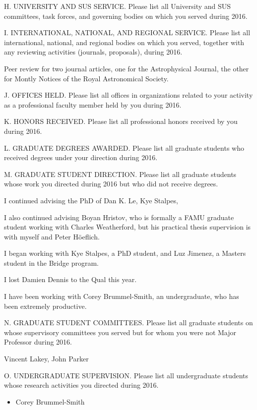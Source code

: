 \noindent H. UNIVERSITY AND SUS SERVICE. Please list all University
and SUS committees, task forces, and governing bodies on which you
served during 2016.
\bigskip
%

\noindent I. INTERNATIONAL, NATIONAL, AND REGIONAL  SERVICE. Please
list all international, national, and regional bodies on which you
served, together with any reviewing activities (journals,
proposals), during 2016.
\bigskip

Peer review for two journal articles, one for the Astrophysical Journal, the
other for Montly Notices of the Royal Astronomical Society.

\noindent J. OFFICES HELD. Please list all offices in organizations
related to your activity as a professional faculty member held by
you during 2016.
\bigskip

\noindent K. HONORS RECEIVED. Please list all professional honors
received by you during 2016.
\bigskip

\noindent L. GRADUATE DEGREES AWARDED. Please list all graduate
students who received degrees under your direction during 2016.
\bigskip


\noindent M. GRADUATE STUDENT DIRECTION. Please list all graduate
students whose work you directed during 2016 but who did not receive
degrees.
\bigskip

I continued advising the PhD of Dan K. Le, Kye Stalpes, 

I also continued advising Boyan Hristov, who is formally a FAMU graduate student
working with Charles Weatherford, but his practical thesis supervision is with
myself and Peter H\"oeflich.

I began working with Kye Stalpes, a PhD student, and Luz Jimenez, a Masters
student in the Bridge program.

I lost Damien Dennis to the Qual this year. 

I have been working with Corey Brummel-Smith, an undergraduate, who has been
extremely productive.   

\noindent N. GRADUATE STUDENT COMMITTEES. Please list all graduate
students on whose supervisory committees you served but for whom you
were not Major Professor during 2016.
\bigskip

Vincent Lakey, John Parker

\noindent O. UNDERGRADUATE SUPERVISION. Please list all
undergraduate students whose research activities you directed during
2016.
\bigskip

\begin{itemize}
\item Corey Brummel-Smith
\end{itemize}

